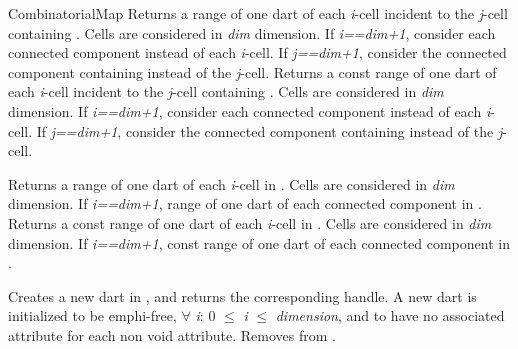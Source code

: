 \begin{ccRefConcept}{CombinatorialMap}
   {Returns a range of one dart of each \emph{i}-cell incident to the \emph{j}-cell 
     containing . Cells are considered in \emph{dim} dimension. If \emph{i==dim+1},  
     consider each connected component instead of each \emph{i}-cell. If \emph{j==dim+1},
     consider the connected component containing  instead of the \emph{j}-cell.
     }
\ccGlue
{}
   {Returns a const range of one dart of each \emph{i}-cell incident to the \emph{j}-cell 
     containing . Cells are considered in \emph{dim} dimension. If \emph{i==dim+1},  
     consider each connected component instead of each \emph{i}-cell. If \emph{j==dim+1},
     consider the connected component containing  instead of the \emph{j}-cell.
     }

    {Returns a range of one dart of each \emph{i}-cell in .
     Cells are considered in \emph{dim} dimension. If \emph{i==dim+1},  
     range of one dart of each connected component in .
  }
\ccGlue
{}
    {Returns a const range of one dart of each \emph{i}-cell in .
     Cells are considered in \emph{dim} dimension. If \emph{i==dim+1},  
     const range of one dart of each connected component in .
   }

   {Creates a new dart in , and returns the corresponding handle.
    A new dart is initialized to be emph{i}-free,
    $\forall$ \emph{i}: 0 $\leq$ \emph{i} $\leq$ \emph{dimension}, and to have no associated 
    attribute for each non void attribute.
  }
   {Removes  from .}


\end{ccRefConcept}
